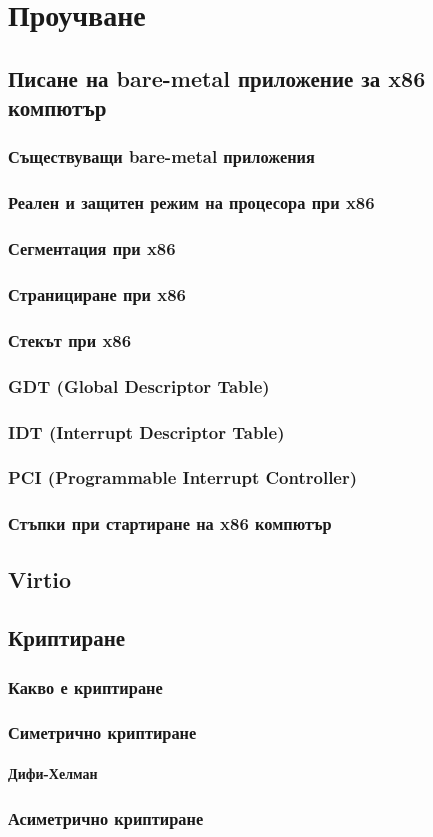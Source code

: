 \chapter{Проучване} %
\hfill
\section{Писане на bare-metal приложение за x86 компютър}
  \subsection{Съществуващи bare-metal приложения}
  \subsection{Реален и защитен режим на процесора при x86}
  \subsection{Сегментация при x86}
  \subsection{Странициране при x86}
  \subsection{Стекът при x86}
  \subsection{GDT (Global Descriptor Table)}
  \subsection{IDT (Interrupt Descriptor Table)}
  \subsection{PCI (Programmable Interrupt Controller)} %
  \subsection{Стъпки при стартиране на x86 компютър}
\section{Virtio}
\section{Криптиране}
  \subsection{Какво е криптиране}
  \subsection{Симетрично криптиране}
    \subsubsection{Дифи-Хелман}
  \subsection{Асиметрично криптиране}
